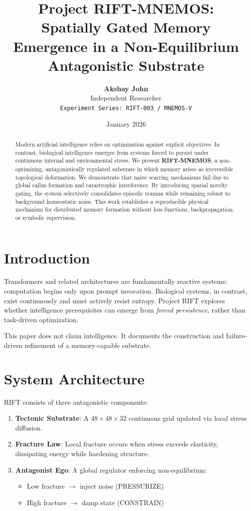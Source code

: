 \documentclass[11pt, a4paper]{article}
\title{\textbf{Project RIFT-MNEMOS:}\\
\large Spatially Gated Memory Emergence in a Non-Equilibrium Antagonistic Substrate}
\author{
\textbf{Akshay John} \\
Independent Researcher \\
\texttt{Experiment Series: RIFT-003 / MNEMOS-V}
}
\date{January 2026}
\begin{document}
\maketitle

\begin{abstract}
Modern artificial intelligence relies on optimization against explicit objectives.
In contrast, biological intelligence emerges from systems forced to persist under continuous internal and environmental stress.
We present \textbf{RIFT-MNEMOS}, a non-optimizing, antagonistically regulated substrate in which memory arises as irreversible topological deformation.
We demonstrate that naive scarring mechanisms fail due to global callus formation and catastrophic interference.
By introducing spatial novelty gating, the system selectively consolidates episodic trauma while remaining robust to background homeostatic noise.
This work establishes a reproducible physical mechanism for distributed memory formation without loss functions, backpropagation, or symbolic supervision.
\end{abstract}

\section{Introduction}

Transformers and related architectures are fundamentally reactive systems: computation begins only upon prompt invocation.
Biological systems, in contrast, exist continuously and must actively resist entropy.
Project RIFT explores whether intelligence prerequisites can emerge from \textit{forced persistence}, rather than task-driven optimization.

This paper does not claim intelligence.
It documents the construction and failure-driven refinement of a memory-capable substrate.

\section{System Architecture}

RIFT consists of three antagonistic components:

\begin{enumerate}
    \item \textbf{Tectonic Substrate}: A $48 \times 48 \times 32$ continuous grid updated via local stress diffusion.
    \item \textbf{Fracture Law}: Local fracture occurs when stress exceeds elasticity, dissipating energy while hardening structure.
    \item \textbf{Antagonist Ego}: A global regulator enforcing non-equilibrium:
    \begin{itemize}
        \item Low fracture $\rightarrow$ inject noise (PRESSURIZE)
        \item High fracture $\rightarrow$ damp state (CONSTRAIN)
    \end{itemize}
\end{enumerate}
\end{document}
